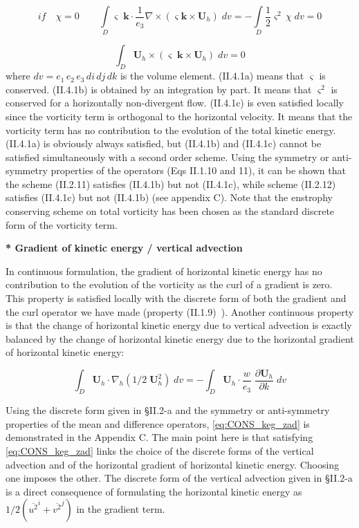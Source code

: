 \documentclass[../main/NEMO_manual]{subfiles}
\begin{document}
\[
  if\quad \chi =0\quad \quad \int\limits_D {\varsigma \;{\textbf{k}}\cdot
    \frac{1}{e_3 }\nabla \times \left( {\varsigma {\textbf{k}}\times {\textbf{U}}_h } \right)\;dv} =-\int\limits_D {\frac{1}{2}\varsigma ^2\,\chi \;dv}
  =0
\]

\[
  \int_D {{\textbf{U}}_h \times \left( {\varsigma \;{\textbf{k}}\times {\textbf{U}}_h } \right)\;dv} =0
\]
where $dv = e_1\, e_2\, e_3\, di\, dj\, dk$ is the volume element.
(II.4.1a) means that $\varsigma $ is conserved. (II.4.1b) is obtained by an integration by part.
It means that $\varsigma^2$ is conserved for a horizontally non-divergent flow.
(II.4.1c) is even satisfied locally since the vorticity term is orthogonal to the horizontal velocity.
It means that the vorticity term has no contribution to the evolution of the total kinetic energy.
(II.4.1a) is obviously always satisfied, but (II.4.1b) and (II.4.1c) cannot be satisfied simultaneously with
a second order scheme.
Using the symmetry or anti-symmetry properties of the operators (Eqs II.1.10 and 11),
it can be shown that the scheme (II.2.11) satisfies (II.4.1b) but not (II.4.1c),
while scheme (II.2.12) satisfies (II.4.1c) but not (II.4.1b) (see appendix C).
Note that the enstrophy conserving scheme on total vorticity has been chosen as the standard discrete form of
the vorticity term.

\textbf{* Gradient of kinetic energy / vertical advection}

In continuous formulation, the gradient of horizontal kinetic energy has no contribution to the evolution of
the vorticity as the curl of a gradient is zero.
This property is satisfied locally with the discrete form of both the gradient and the curl operator we have made
(property (II.1.9)~).
Another continuous property is that the change of horizontal kinetic energy due to
vertical advection is exactly balanced by the change of horizontal kinetic energy due to
the horizontal gradient of horizontal kinetic energy:

\begin{equation} \label{eq:CONS_keg_zad}
\int_D {{\textbf{U}}_h \cdot \nabla _h \left( {1/2\;{\textbf{U}}_h ^2} \right)\;dv} =-\int_D {{\textbf{U}}_h \cdot \frac{w}{e_3 }\;\frac{\partial
{\textbf{U}}_h }{\partial k}\;dv}
\end{equation}

Using the discrete form given in {\S}II.2-a and the symmetry or anti-symmetry properties of
the mean and difference operators, \autoref{eq:CONS_keg_zad} is demonstrated in the Appendix C.
The main point here is that satisfying \autoref{eq:CONS_keg_zad} links the choice of the discrete forms of
the vertical advection and of the horizontal gradient of horizontal kinetic energy.
Choosing one imposes the other.
The discrete form of the vertical advection given in {\S}II.2-a is a direct consequence of
formulating the horizontal kinetic energy as $1/2 \left( \overline{u^2}^i + \overline{v^2}^j \right) $ in
the gradient term.
\end{document}
